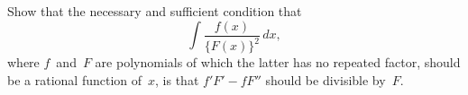 Show that the necessary and sufficient condition that
\[
\int \frac{f(x)}{\{F(x)\}^{2}}\, dx,
\]
where $f$~and~$F$ are polynomials of which the latter has no repeated factor,
should be a rational function of~$x$, is that $f'F' - fF''$ should be divisible by~$F$.

